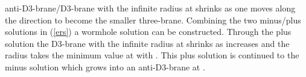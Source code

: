 \documentclass[12pt,a4paper]{article}
\begin{document}
anti-D3-brane/D3-brane with the infinite radius at \myHighlight{$\sigma = 
\sigma_{\infty}$}\coordHE{} shrinks as one moves along the \myHighlight{$\mp \sigma$}\coordHE{} direction
to become the smaller three-brane. Combining the two minus/plus solutions
in (\ref{ers}) a wormhole solution can be constructed. Through the plus
solution the D3-brane with the infinite radius at \myHighlight{$\sigma = 
\sigma_{\infty}$}\coordHE{} shrinks as \myHighlight{$\sigma$}\coordHE{} increases and the radius takes the
minimum value \coordHE{} at \myHighlight{$\sigma = \sigma_{\infty} + \Delta\sigma$}\coordHE{} with
\coordHE{}. This plus solution is continued to the minus
solution which grows into an anti-D3-brane at \myHighlight{$\sigma = \sigma_{\infty}
+2\Delta\sigma$}\coordHE{}.
\end{document}
